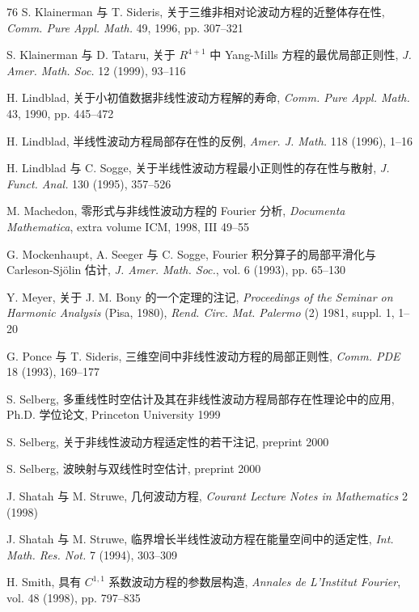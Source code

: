 \begin{mybibliography}{76}
 S. Klainerman 与 T. Sideris,  关于三维非相对论波动方程的近整体存在性,  \emph{Comm. Pure Appl. Math.} 49,  1996,  pp. 307--321

 S. Klainerman 与 D. Tataru,  关于 $R^{4+1}$ 中 Yang-Mills 方程的最优局部正则性,  \emph{J. Amer. Math. Soc.} 12 (1999),  93--116

 H. Lindblad,  关于小初值数据非线性波动方程解的寿命,  \emph{Comm. Pure Appl. Math.} 43,  1990,  pp. 445--472

 H. Lindblad,  半线性波动方程局部存在性的反例,  \emph{Amer. J. Math.} 118 (1996),  1--16

 H. Lindblad 与 C. Sogge,  关于半线性波动方程最小正则性的存在性与散射,  \emph{J. Funct. Anal.} 130 (1995),  357--526

 M. Machedon,  零形式与非线性波动方程的 Fourier 分析,  \emph{Documenta Mathematica},  extra volume ICM,  1998,  III 49--55

 G. Mockenhaupt,  A. Seeger 与 C. Sogge,  Fourier 积分算子的局部平滑化与 Carleson-Sjölin 估计,  \emph{J. Amer. Math. Soc.},  vol. 6 (1993),  pp. 65--130

 Y. Meyer,  关于 J. M. Bony 的一个定理的注记,  \emph{Proceedings of the Seminar on Harmonic Analysis} (Pisa,  1980),  \emph{Rend. Circ. Mat. Palermo} (2) 1981,  suppl. 1,  1--20

 G. Ponce 与 T. Sideris,  三维空间中非线性波动方程的局部正则性,  \emph{Comm. PDE} 18 (1993),  169--177

 S. Selberg,  多重线性时空估计及其在非线性波动方程局部存在性理论中的应用,  Ph.D. 学位论文,  Princeton University 1999

 S. Selberg,  关于非线性波动方程适定性的若干注记,  preprint 2000

 S. Selberg,  波映射与双线性时空估计,  preprint 2000

 J. Shatah 与 M. Struwe,  几何波动方程,  \emph{Courant Lecture Notes in Mathematics} 2 (1998)

 J. Shatah 与 M. Struwe,  临界增长半线性波动方程在能量空间中的适定性,  \emph{Int. Math. Res. Not.} 7 (1994),  303--309

 H. Smith,  具有 $C^{1, 1}$ 系数波动方程的参数层构造,  \emph{Annales de L'Institut Fourier},  vol. 48 (1998),  pp. 797--835


\end{mybibliography}

